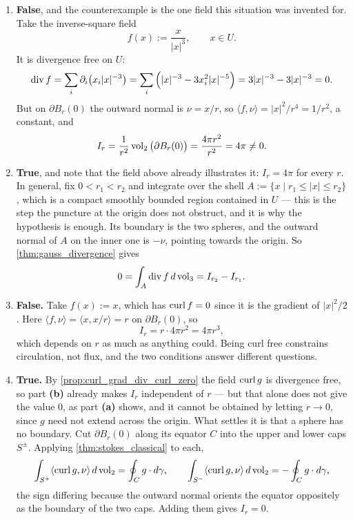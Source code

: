 \begin{exercisesolution}
\label{sol:flux_through_nested_spheres}
\begin{enumerate}[label=\textbf{(\alph*)}]
  \item \textbf{False}, and the counterexample is the one field this situation was invented for.
    Take the inverse-square field
    \[f(x) := \frac{x}{\lvert x\rvert^3}, \qquad x \in U .\]
    It is divergence free on $U$:
    \[\operatorname{div} f = \sum_i \partial_i\big(x_i\lvert x\rvert^{-3}\big)
      = \sum_i\Big(\lvert x\rvert^{-3} - 3x_i^2\lvert x\rvert^{-5}\Big)
      = 3\lvert x\rvert^{-3} - 3\lvert x\rvert^{-3} = 0 .\]
    But on $\partial B_r(0)$ the outward normal is $\nu = x/r$, so
    $\langle f,\nu\rangle = \lvert x\rvert^2/r^4 = 1/r^2$, a constant, and
    \[I_r = \frac{1}{r^2}\operatorname{vol}_2\big(\partial B_r(0)\big) = \frac{4\pi r^2}{r^2} = 4\pi \neq 0 .\]
  \item \textbf{True}, and note that the field above already illustrates it: $I_r = 4\pi$ for
    every $r$. In general, fix $0 < r_1 < r_2$ and integrate over the shell
    $A := \{x \mid r_1 \leq \lvert x\rvert \leq r_2\}$, which is a compact smoothly bounded region
    contained in $U$ --- this is the step the puncture at the origin does not obstruct, and it is
    why the hypothesis is enough. Its boundary is the two spheres, and the outward normal of $A$
    on the inner one is $-\nu$, pointing towards the origin. So \cref{thm:gauss_divergence} gives
    \[0 = \int_A \operatorname{div} f\,d\operatorname{vol}_3 = I_{r_2} - I_{r_1} .\]
  \item \textbf{False.} Take $f(x) := x$, which has $\operatorname{curl} f = 0$ since it is the gradient of
    $\lvert x\rvert^2/2$. Here $\langle f,\nu\rangle = \langle x, x/r\rangle = r$ on
    $\partial B_r(0)$, so
    \[I_r = r\cdot 4\pi r^2 = 4\pi r^3 ,\]
    which depends on $r$ as much as anything could. Being curl free constrains circulation, not
    flux, and the two conditions answer different questions.
  \item \textbf{True.} By \cref{prop:curl_grad_div_curl_zero} the field $\operatorname{curl} g$ is divergence
    free, so part \textbf{(b)} already makes $I_r$ independent of $r$ --- but that alone does not
    give the value $0$, as part \textbf{(a)} shows, and it cannot be obtained by letting
    $r \to 0$, since $g$ need not extend across the origin. What settles it is that a sphere has
    no boundary. Cut $\partial B_r(0)$ along its equator $C$ into the upper and lower caps
    $S^{\pm}$. Applying \cref{thm:stokes_classical} to each,
    \[\int_{S^+}\langle\operatorname{curl} g,\nu\rangle\,d\operatorname{vol}_2 = \oint_{C} g\cdot d\gamma,
      \qquad
      \int_{S^-}\langle\operatorname{curl} g,\nu\rangle\,d\operatorname{vol}_2 = -\oint_{C} g\cdot d\gamma,\]
    the sign differing because the outward normal orients the equator oppositely as the boundary
    of the two caps. Adding them gives $I_r = 0$.
\end{enumerate}


\end{exercisesolution}
